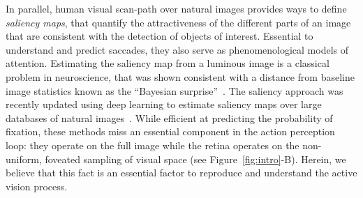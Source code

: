 In parallel, human visual scan-path over natural images provides ways to define \emph{saliency maps}, that quantify the attractiveness of the different parts of an image that are consistent with the detection of objects of interest. Essential to understand and predict saccades, they also serve as phenomenological models of attention. Estimating the saliency map from a luminous image is a classical problem in neuroscience, that was shown consistent with a distance from baseline image statistics known as the ``Bayesian surprise''~\cite{Itti01}. The saliency approach was recently updated using deep learning to estimate saliency maps over large databases of natural images~\cite{Kummerer17}. %
While efficient at predicting the probability of fixation, these methods miss an essential component in the action perception loop: they operate on the full image while the retina operates on the non-uniform, foveated sampling of visual space (see Figure~\ref{fig:intro}-B).
Herein, we believe that this fact is an essential factor to reproduce and understand the active vision process.

